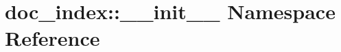 \hypertarget{namespacedoc__index_1_1____init____}{
\section{doc\_\-index::\_\-\_\-init\_\-\_\- Namespace Reference}
\label{namespacedoc__index_1_1____init____}
}


